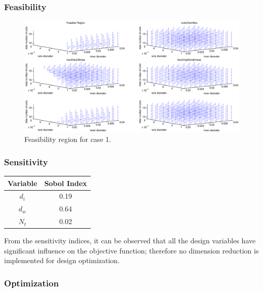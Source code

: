 \documentclass[10pt]{article}
\begin{document}
\subsubsection{Feasibility}
	
			\begin{figure}[h!]
		 \begin{center}\includegraphics[scale=.35]{Case_56_3891011_Feasibility.eps}\end{center}
		 \caption{Feasibility region for case 1.}
		 \label{Feasibility region for case 1.}
		 \end{figure}
		 
\subsubsection{Sensitivity}		
 
		 \begin{center}
	 \begin{tabular}{| c  | c |  }
	 	\hline Variable & Sobol Index\\
	 	\hline $d_{i}$ & 0.19 \\
		\hline $d_{w}$ & 0.64  \\
		\hline $N_{t}$ & 0.02 \\ 
		\hline
	 \end{tabular}
\end{center}

From the sensitivity indices, it can be observed that all the design variables have significant influence on the objective function; therefore no dimension reduction is implemented for design optimization. 


\subsubsection{Optimization}
	
\end{document}
